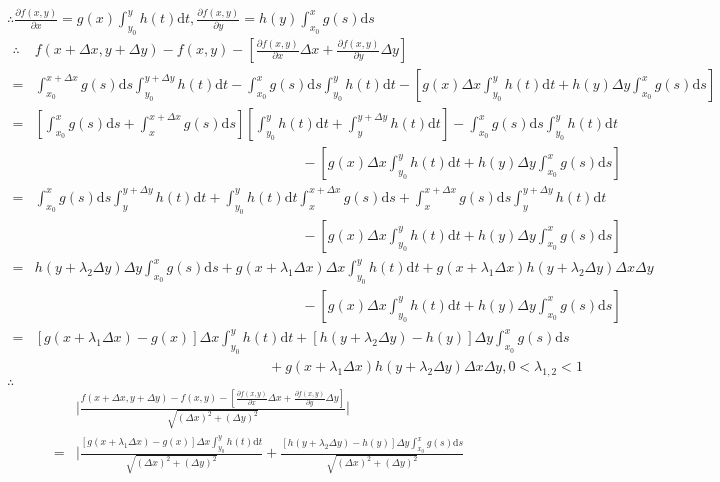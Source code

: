 \documentclass[12pt,UTF8]{ctexart}
\newcommand{\Int}[4]{\int_{#1}^{#2}#3\mathrm d#4}
\begin{document}
\begin{enumerate}
$\therefore\frac{\partial f(x,y)}{\partial x}=g(x)\int_{y_0}^yh(t)\mathrm dt,\frac{\partial f(x,y)}{\partial y}=h(y)\int_{x_0}^xg(s)\mathrm ds$
\[\begin{split}
\therefore&f(x+\Delta x,y+\Delta y)-f(x,y)-[\frac{\partial f(x,y)}{\partial x}\Delta x+\frac{\partial f(x,y)}{\partial y}\Delta y]\\
=&\int_{x_0}^{x+\Delta x}g(s)\mathrm ds\int_{y_0}^{y+\Delta y}h(t)\mathrm dt-\int_{x_0}^xg(s)\mathrm ds\int_{y_0}^yh(t)\mathrm dt-[g(x)\Delta x\int_{y_0}^yh(t)\mathrm dt+h(y)\Delta y\int_{x_0}^xg(s)\mathrm ds]\\
=&[\Int{x_0}{x}{g(s)}{s}+\Int{x}{x+\Delta x}{g(s)}{s}][\Int{y_0}{y}{h(t)}{t}+\Int{y}{y+\Delta y}{h(t)}{t}]-\Int{x_0}{x}{g(s)}{s}\Int{y_0}{y}{h(t)}{t}\\
&\hspace{8cm}-[g(x)\Delta x\Int{y_0}{y}{h(t)}{t}+h(y)\Delta y\Int{x_0}{x}{g(s)}{s}]\\
=&\Int{x_0}{x}{g(s)}{s}\Int{y}{y+\Delta y}{h(t)}{t}+\Int{y_0}{y}{h(t)}{t}\Int{x}{x+\Delta x}{g(s)}{s}+\Int{x}{x+\Delta x}{g(s)}{s}\Int{y}{y+\Delta y}{h(t)}{t}\\
&\hspace{8cm}-[g(x)\Delta x\Int{y_0}{y}{h(t)}{t}+h(y)\Delta y\Int{x_0}{x}{g(s)}{s}]\\
=&h(y+\lambda_2\Delta y)\Delta y\Int{x_0}{x}{g(s)}{s}+g(x+\lambda_1\Delta x)\Delta x\Int{y_0}{y}{h(t)}{t}+g(x+\lambda_1\Delta x)h(y+\lambda_2\Delta y)\Delta x\Delta y\\
&\hspace{8cm}-[g(x)\Delta x\Int{y_0}{y}{h(t)}{t}+h(y)\Delta y\Int{x_0}{x}{g(s)}{s}]\\
=&[g(x+\lambda_1\Delta x)-g(x)]\Delta x\Int{y_0}{y}{h(t)}{t}+[h(y+\lambda_2\Delta y)-h(y)]\Delta y\Int{x_0}{x}{g(s)}{s}\\
&\hspace{7cm}+g(x+\lambda_1\Delta x)h(y+\lambda_2\Delta y)\Delta x\Delta y,0<\lambda_{1,2}<1
\end{split}\]
$\therefore$
\[\begin{split}
&\Big|\frac{f(x+\Delta x,y+\Delta y)-f(x,y)-[\frac{\partial f(x,y)}{\partial x}\Delta x+\frac{\partial f(x,y)}{\partial y}\Delta y]}{\sqrt{(\Delta x)^2+(\Delta y)^2}}\Big|\\
=&\Big|\frac{[g(x+\lambda_1\Delta x)-g(x)]\Delta x\Int{y_0}{y}{h(t)}{t}}{\sqrt{(\Delta x)^2+(\Delta y)^2}}+\frac{[h(y+\lambda_2\Delta y)-h(y)]\Delta y\Int{x_0}{x}{g(s)}{s}}{\sqrt{(\Delta x)^2+(\Delta y)^2}}\\

\end{split}\]
\end{enumerate}
\end{document}
